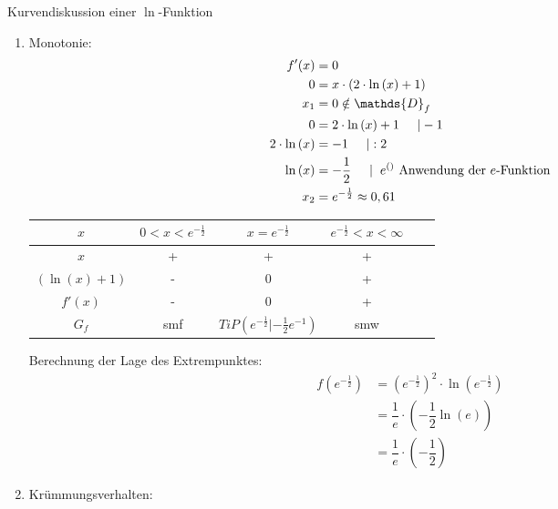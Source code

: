 \begin{bsp}{Kurvendiskussion einer $\ln$-Funktion}{ }
\begin{enumerate}
\item Monotonie:
        \begin{equation*}
            \begin{split}
                f'(x)&=0\\
               0&= x\cdot (2\cdot\ln{(x)} +1)\\
                x_1&= 0 \notin \mathds{D}_f\\
                0&= 2\cdot\ln{(x)} +1 \hspace{0.5cm} | -1\\
                 2\cdot\ln{(x)}&= -1 \hspace{0.5cm} | :2\\
                \ln{(x)}&= -\frac{1}{2} \hspace{0.5cm} |\hspace{0.2cm} e^{()} \text{ Anwendung der $e$-Funktion}\\
                x_2&= e^{-\frac{1}{2}}\approx 0,61
            \end{split}
        \end{equation*}
\begin{center}\begin{tabular}{||c|c|c|c|c|c||}
    \hline
    $x$& $ 0<x<e^{-\frac{1}{2}} $ & $ x =e^{-\frac{1}{2}}$ &$ e^{-\frac{1}{2}}<x<\infty $ \\
    \hline \hline
    $x$ & + & + & +   \\
    \hline
    $(\ln{(x)}+1)$ & - & 0 & +  \\
     \hline
    $f'(x)$ & - & 0 & + \\ 
    \hline
    \hline
    $G_f$ & smf & $TiP(e^{-\frac{1}{2}}|-\frac{1}{2} e^{-1})$ & smw  \\
    \hline
\end{tabular}
\end{center}
Berechnung der Lage des Extrempunktes:
        \begin{equation*}
            \begin{split}
               f(e^{-\frac{1}{2}}) &= (e^{-\frac{1}{2}})^2 \cdot \ln{(e^{-\frac{1}{2}})}\\
               &= \dfrac{1}{e} \cdot\left( -\dfrac{1}{2} \ln{(e)}\right)\\
                &= \dfrac{1}{e} \cdot \left(-\dfrac{1}{2}\right)
            \end{split}
        \end{equation*}
        \item Krümmungsverhalten:
        \begin{equation*}

\end{equation*}
\end{enumerate}
\end{bsp}
